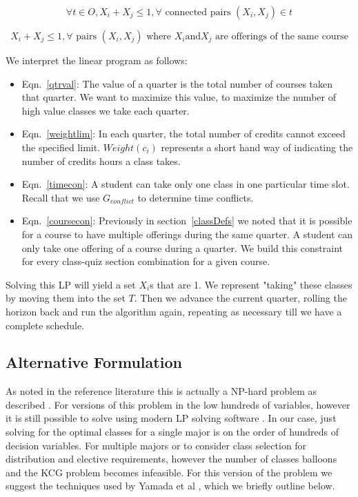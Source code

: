 \documentclass[11pt]{article} %
\begin{document}
\begin{equation}
    \forall t \in O,X_i+X_j \leq 1, \forall \text{ connected pairs } (X_i,X_j) \in t
    \label{timecon}
\end{equation}

\begin{equation}
   X_i + X_j \leq 1, \forall \text{ pairs } (X_i,X_j) \text{ where } X_i \text{and} X_j \text{ are offerings of
   the same course}
    \label{coursecon}
\end{equation}

We interpret the linear program as follows: \begin{itemize} \item
Eqn.~\ref{qtrval}: The value of a quarter is the total number of courses taken
that quarter.  We want to maximize this value, to maximize the number of high
value classes we take each quarter.  \item Eqn.~\ref{weightlim}: In each quarter,
the total number of credits cannot exceed the specified limit.  $Weight(c_i)$
represents a short hand way of indicating the number of credits hours a class
takes.  \item Eqn.~\ref{timecon}: A student can take only one class in one particular
time slot.  Recall that we use $G_{conflict}$ to determine time conflicts.
\item Eqn.~\ref{coursecon}: Previously in
section~\ref{classDefs} we noted that it is possible for a course to have multiple
offerings during the same quarter.  A student can only take one offering
of a course during a quarter.  We build this constraint for every class-quiz section
combination for a given course.\end{itemize}

Solving this LP will yield a set $X_i$s that are 1.  We represent "taking" these
classes by moving them into the set $T$.  Then we advance the current quarter,
rolling the horizon back and run the algorithm again, repeating as necessary
till we have a complete schedule.

\subsection{Alternative Formulation} As noted in the reference literature this
is actually a NP-hard problem as described \cite{pferschy:kcg}.  For versions of
this problem in the low hundreds of variables, however it is still possible to
solve using modern LP solving software \cite{yamada:heuristic}.  In our case,
just solving for the optimal classes for a single major is on the order of
hundreds of decision variables.  For multiple majors or to
consider class selection for distribution and elective requirements, however the
number of classes balloons and the KCG problem becomes infeasible.
For this version of the problem we suggest the techniques used by Yamada
et al \cite{yamada:heuristic}, which we briefly outline below.
\end{document}
